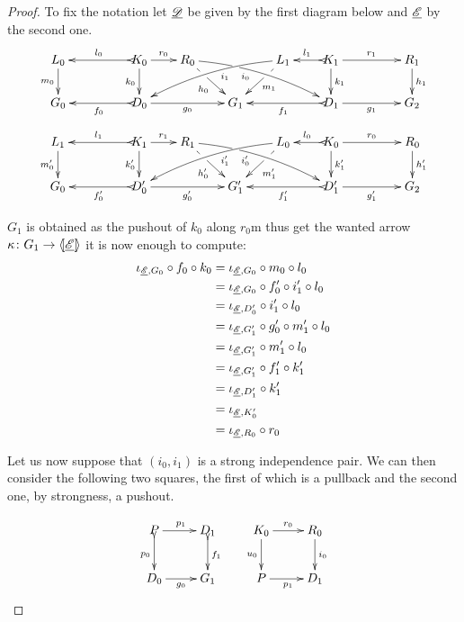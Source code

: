 \begin{proof}
	To fix the notation let $\underline{\mathscr{D}}$ be given by the first diagram below and $\underline{\mathscr{E}}$ by the second one.
	\[\xymatrix@R=20pt@C=20pt{L_0 \ar[d]_{m_0}&& K_0
		\ar[d]_{k_0}\ar@{>->}[ll]_{l_0} \ar[r]^{r_0} & R_0
		\ar@{>}@/^.25cm/[drrr]|(.32)\hole_(.4){i_0}
		\ar[dr]|(.33)\hole_{h_0} && L_1 \ar@{>}@/_.25cm/[dlll]^(.4){i_1}
		\ar[dl]|(.33)\hole^{m_1}& K_1 \ar[d]^{k_1}\ar@{>->}[l]_{l_1}
		\ar[rr]^{r_1} && R_1 \ar[d]^{h_1}\\G_0 && \ar@{>->}[ll]^{f_0}
		D_0 \ar[rr]_{g_0}&& G_1 && \ar@{>->}[ll]^{f_1} D_1
		\ar[rr]_{g_1}&& G_2}
	\]
	\[
	\xymatrix@R=20pt@C=20pt{
		{L_1} \ar[d]_{m_0'}
		&&  {K_1} \ar@{>->}[ll]_{l_1} \ar[r]^{r_1} \ar[d]_{k_0'}
		&  {R_1} \ar[dr]|(.33)\hole_{h_0'}  \ar@/^.25cm/@{>}_(.4){i_0'}|(.32)\hole[drrr]
		& & 
		{L_0}\ar[dl]|(.33)\hole^{m_1'} \ar@/_.25cm/@{>}^(.4){i_1'}[dlll] 
		&  {K_0} \ar@{>->}[l]_{l_0} \ar[rr]^{r_0} \ar[d]^{k_1'}
		& & {R_0} \ar[d]^{h_1'} \\		
		{G_0}
		& & {D_0'} \ar@{>->}[ll]^{f_0'} \ar[rr]_{g_0'}
		& &  {G'_1} 
		& &  {D_1'} \ar@{>->}[ll]^{f_1'} \ar[rr]_{g_1'}
		& & {G_2}  }
	\]
	
 $G_1$ is obtained as the pushout of $k_0$ along $r_0$m thus get the wanted arrow $\kappa\colon G_1\to \langle \hspace{-1.85pt}[ \underline{\mathscr{E}}]\hspace{-1.85pt}\rangle$ it is now enough to compute:
	\begin{align*}
		\iota_{\underline{\mathscr{E}}, G_0}\circ f_{0}\circ  k_{0}&= \iota_{\underline{\mathscr{E}}, G_0}\circ m_{0} \circ l_{ 0}\\&=\iota_{\underline{\mathscr{E}}, G_0}\circ  f'_{0} \circ i'_1 \circ l_0\\&=\iota_{\underline{\mathscr{E}}, D'_0}\circ i'_1 \circ l_0\\&=\iota_{\underline{\mathscr{E}}, G'_1} \circ g'_0\circ m'_1 \circ l_0\\&=\iota_{\underline{\mathscr{E}}, G'_1}\circ m'_1\circ l_0	\\&=\iota_{\underline{\mathscr{E}}, G'_1} \circ f'_1\circ k'_1\\&=\iota_{\underline{\mathscr{E}}, D'_1}\circ k'_1\\&=\iota_{\underline{\mathscr{E}}, K'_0}\\&= \iota_{\underline{\mathscr{E}}, R_0} \circ r_0
	\end{align*}
	
	Let us now suppose that $(i_0,i_1)$ is a strong independence pair. We can then consider the following two squares, the first of which is a pullback and the second one, by strongness, a  pushout.
	
			\[\xymatrix{P \ar[r]^{p_1}  \ar@{>->}[d]_{p_0} & D_1 \ar@{>->}[d]^{f_1} & K_0 \ar[r]^{r_0}  \ar[d]_{u_0} & R_0 \ar[d]^{i_0}\\ D_0\ar[r]_{g_0} & G_1 & P\ar[r]_{p_1} & D_1}\]


\end{proof}
